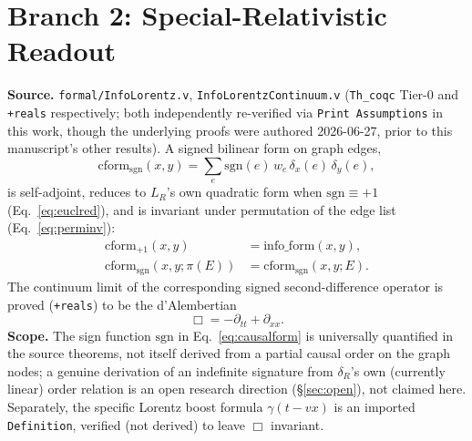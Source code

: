 \documentclass[10pt,twocolumn]{article}
\begin{document}
\section{Branch 2: Special-Relativistic Readout}
\label{sec:sr}
\textbf{Source.} \texttt{formal/InfoLorentz.v}, \texttt{InfoLorentzContinuum.v}
(\texttt{Th\_coqc} Tier-0 and \texttt{+reals} respectively; both independently
re-verified via \texttt{Print Assumptions} in this work, though the underlying
proofs were authored 2026-06-27, prior to this manuscript's other results).
A signed bilinear form on graph edges,
\begin{equation}
\mathrm{cform}_{\mathrm{sgn}}(x,y) = \sum_e \mathrm{sgn}(e)\, w_e\, \delta_x(e)\,\delta_y(e),
\label{eq:causalform}
\end{equation}
is self-adjoint, reduces to $L_R$'s own quadratic form when $\mathrm{sgn}\equiv+1$
(Eq.~\ref{eq:euclred}), and is invariant under permutation of the edge list
(Eq.~\ref{eq:perminv}):
\begin{align}
\mathrm{cform}_{+1}(x,y) &= \mathrm{info\_form}(x,y), \label{eq:euclred}\\
\mathrm{cform}_{\mathrm{sgn}}(x,y;\pi(E)) &= \mathrm{cform}_{\mathrm{sgn}}(x,y;E). \label{eq:perminv}
\end{align}
The continuum limit of the corresponding signed second-difference operator is proved
(\texttt{+reals}) to be the d'Alembertian
\begin{equation}
\Box = -\partial_{tt} + \partial_{xx}.
\label{eq:box}
\end{equation}
\textbf{Scope.} The sign function $\mathrm{sgn}$ in Eq.~\ref{eq:causalform} is
universally quantified in the source theorems, not itself derived from a partial
causal order on the graph nodes; a genuine derivation of an indefinite signature from
$\delta_R$'s own (currently linear) order relation is an open research direction
(\S\ref{sec:open}), not claimed here. Separately, the specific Lorentz boost formula
$\gamma(t-vx)$ \cite{lorentz1904,einstein1905b} is an imported \texttt{Definition},
verified (not derived) to leave $\Box$ invariant.
\end{document}
